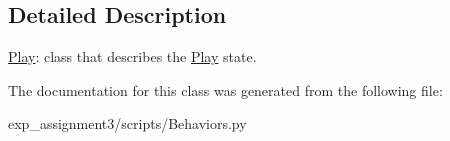\subsection{Detailed Description}
\hyperlink{classBehaviors_1_1Play}{Play}\+: class that describes the \hyperlink{classBehaviors_1_1Play}{Play} state. 

The documentation for this class was generated from the following file\+:\begin{DoxyCompactItemize}
\item 
exp\+\_\+assignment3/scripts/Behaviors.\+py\end{DoxyCompactItemize}
